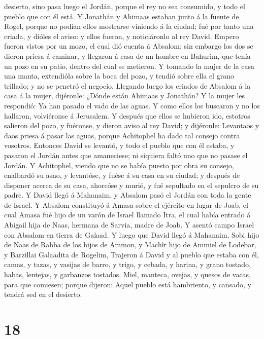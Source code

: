 desierto, sino pasa luego el Jordán, porque el rey no sea consumido, y
todo el pueblo que con él está.  Y Jonathán y Ahimaas
estaban junto á la fuente de Rogel, porque no podían ellos mostrarse
viniendo á la ciudad; fué por tanto una criada, y dióles el aviso: y
ellos fueron, y noticiáronlo al rey David.  Empero fueron
vistos por un mozo, el cual dió cuenta á Absalom: sin embargo los dos se
dieron priesa á caminar, y llegaron á casa de un hombre en Bahurim, que
tenía un pozo en su patio, dentro del cual se metieron. 
Y tomando la mujer de la casa una manta, extendióla sobre la boca del
pozo, y tendió sobre ella el grano trillado; y no se penetró el negocio.
 Llegando luego los criados de Absalom á la casa á la
mujer, dijéronle: ¿Dónde están Ahimaas y Jonathán? Y la mujer les
respondió: Ya han pasado el vado de las aguas. Y como ellos los buscaron
y no los hallaron, volviéronse á Jerusalem.  Y después
que ellos se hubieron ido, estotros salieron del pozo, y fuéronse, y
dieron aviso al rey David; y dijéronle: Levantaos y daos priesa á pasar
las aguas, porque Achitophel ha dado tal consejo contra vosotros.
 Entonces David se levantó, y todo el pueblo que con él
estaba, y pasaron el Jordán antes que amaneciese; ni siquiera faltó uno
que no pasase el Jordán.  Y Achitophel, viendo que no se
había puesto por obra su consejo, enalbardó su asno, y levantóse, y
fuése á su casa en su ciudad; y después de disponer acerca de su casa,
ahorcóse y murió, y fué sepultado en el sepulcro de su padre.
 Y David llegó á Mahanaim, y Absalom pasó el Jordán con
toda la gente de Israel.  Y Absalom constituyó á Amasa
sobre el ejército en lugar de Joab, el cual Amasa fué hijo de un varón
de Israel llamado Itra, el cual había entrado á Abigail hija de Naas,
hermana de Sarvia, madre de Joab.  Y asentó campo Israel
con Absalom en tierra de Galaad.  Y luego que David llegó
á Mahanaim, Sobi hijo de Naas de Rabba de los hijos de Ammon, y Machîr
hijo de Ammiel de Lodebar, y Barzillai Galaadita de Rogelim,
 Trajeron á David y al pueblo que estaba con él, camas, y
tazas, y vasijas de barro, y trigo, y cebada, y harina, y grano tostado,
habas, lentejas, y garbanzos tostados,  Miel, manteca,
ovejas, y quesos de vacas, para que comiesen; porque dijeron: Aquel
pueblo está hambriento, y cansado, y tendrá sed en el desierto.

\hypertarget{section-17}{%
\section{18}\label{section-17}}

